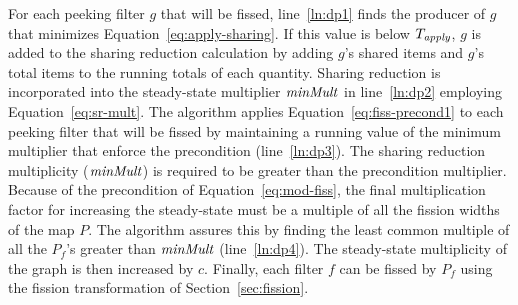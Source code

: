 For each peeking filter $g$ that will be fissed, line~\ref{ln:dp1}
finds the producer of $g$ that minimizes
Equation~\ref{eq:apply-sharing}.  If this value is below
$T_{\relax{\it apply}}$, $g$ is added to the sharing reduction calculation by
adding $g$'s shared items and $g$'s total items to the running totals
of each quantity.  Sharing reduction is incorporated into the
steady-state multiplier $\relax{\it minMult}$ in line~\ref{ln:dp2} employing
Equation~\ref{eq:sr-mult}.  The algorithm applies
Equation~\ref{eq:fiss-precond1} to each peeking filter that will be
fissed by maintaining a running value of the minimum multiplier that
enforce the precondition (line~\ref{ln:dp3}).  The sharing reduction
multiplicity ($\relax{\it minMult}$) is required to be greater than the
precondition multiplier.  Because of the precondition of
Equation~\ref{eq:mod-fiss}, the final multiplication factor for
increasing the steady-state must be a multiple of all the fission
widths of the map $P$. The algorithm assures this by finding the least
common multiple of all the $P_f$'s greater than $\relax{\it minMult}$
(line~\ref{ln:dp4}).  The steady-state multiplicity of the graph is
then increased by $c$.  Finally, each filter $f$ can be fissed by $P_f$
using the fission transformation of Section~\ref{sec:fission}.



